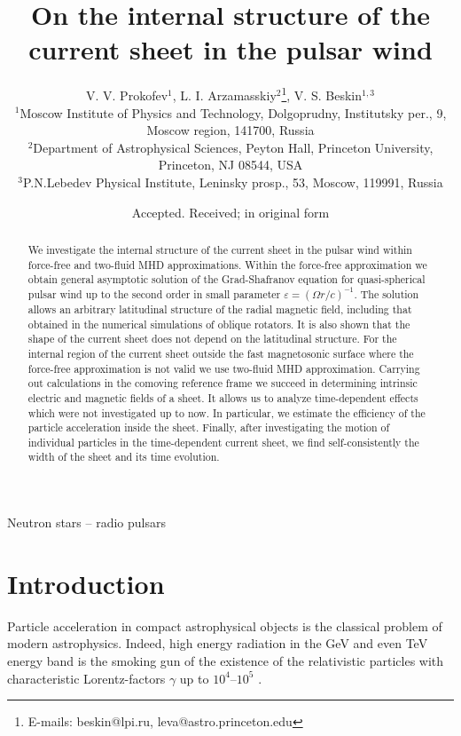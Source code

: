 \documentclass[useAMS,usenatbib]{mn2e}
\title[On the internal structure of the current sheet in the pulsar wind]{On the internal
structure of the current sheet in the pulsar wind}
\author [V. V. Prokofev, L. I. Arzamasskiy and V. S. Beskin]{V. V. Prokofev$^1$, L. I. Arzamasskiy$^{2}$\thanks{E-mails:
beskin@lpi.ru, leva@astro.princeton.edu},
V. S. Beskin$^{1,3}$\footnotemark[1]\\
$^{1}$Moscow Institute of Physics and Technology, Dolgoprudny, Institutsky per., 9,
Moscow region, 141700, Russia\\
$^{2}$Department of Astrophysical Sciences, Peyton Hall, Princeton University, Princeton, NJ 08544, USA \\
$^{3}$P.N.Lebedev Physical Institute, Leninsky prosp., 53, Moscow,
119991, Russia}
\begin{document}
\date{Accepted. Received; in original form}

\pagerange{\pageref{firstpage}--\pageref{lastpage}} 

\maketitle

\label{firstpage}

\begin{abstract}
We investigate { the internal structure of the current sheet in the pulsar
wind within} force-free and two-fluid MHD approximations. Within the 
force-free approximation we obtain { general} asymptotic solution of the
Grad-Shafranov equation for quasi-spherical pulsar wind { up to the second
order in small parameter $\varepsilon = (\Omega r/c)^{-1}$. The solution allows an arbitrary latitudinal structure of the radial magnetic field, including that obtained in the numerical simulations of oblique rotators. 
It is also shown that the shape of the current sheet does not depend on the 
latitudinal structure.} 
For the internal region of the current sheet { outside the fast magnetosonic 
surface} where the force-free approximation is not valid we use two-fluid MHD approximation.  
{ Carrying out calculations in the 
comoving reference frame we succeed in determining intrinsic electric and magnetic fields 
of a sheet. It allows us to analyze time-dependent effects which were not investigated
up to now. In particular, we estimate} the efficiency of the particle 
acceleration inside the sheet. Finally, after investigating the motion of individual 
particles in the time-dependent current sheet, we find self-consistently the width of the 
sheet and its time evolution.
\end{abstract}

\begin{keywords}
Neutron stars -- radio pulsars
\end{keywords}


\section{Introduction}
\label{sect:intro}

Particle acceleration in compact astrophysical objects is the classical
problem of modern astrophysics. Indeed, high energy radiation in the GeV
and even TeV energy band is the smoking gun of the existence of the relativistic
particles with characteristic Lorentz-factors $\gamma$ up to $10^4$--$10^5$ 
\citep{2000PhRvL..85..912L, 2007A&A...464..235A}.
\end{document}

